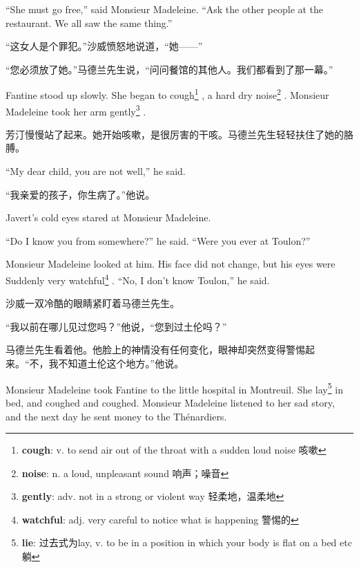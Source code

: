\documentclass[fontset=ubuntu, zihao=5]{ctexart}
\begin{document}
\begin{paracol}{2}
  ``She must go free,'' said Monsieur Madeleine. ``Ask the other people at the restaurant. We all saw the same thing.''


  \switchcolumn

  “这女人是个罪犯。”沙威愤怒地说道，“她——”

  “您必须放了她。”马德兰先生说，“问问餐馆的其他人。我们都看到了那一幕。”

  \switchcolumn*

  Fantine stood up slowly. She began to cough\footnote{\textbf{cough}: v. to
    send air out of the throat with a sudden loud noise 咳嗽} , a hard dry
  noise\footnote{\textbf{noise}: n. a loud, unpleasant sound 响声；噪音}
  . Monsieur Madeleine took her arm gently\footnote{\textbf{gently}: adv. not in a strong or violent way 轻柔地，温柔地}
  .

  \switchcolumn

  芳汀慢慢站了起来。她开始咳嗽，是很厉害的干咳。马德兰先生轻轻扶住了她的胳膊。


  \switchcolumn*

  ``My dear child, you are not well,'' he said.

  \switchcolumn

  “我亲爱的孩子，你生病了。”他说。

  \switchcolumn*

  Javert's cold eyes stared at Monsieur Madeleine.


  ``Do I know you from somewhere?'' he said. ``Were you ever at Toulon?''


  Monsieur Madeleine looked at him. His face did not change, but his eyes were Suddenly very watchful\footnote{\textbf{watchful}: adj. very careful to notice what is happening 警惕的}
  . ``No, I don't know Toulon,'' he said.

  \switchcolumn

  沙威一双冷酷的眼睛紧盯着马德兰先生。


  “我以前在哪儿见过您吗？”他说，“您到过土伦吗？”


  马德兰先生看着他。他脸上的神情没有任何变化，眼神却突然变得警惕起来。“不，我不知道土伦这个地方。”他说。


  \switchcolumn*

  Monsieur Madeleine took Fantine to the little hospital in Montreuil. She
  lay\footnote{\textbf{lie}: 过去式为lay, v. to be in a position in which your body is flat on a bed etc 躺}
  in bed, and coughed and coughed. Monsieur Madeleine listened to her sad story, and the next day he sent money to the Thénardiers.


\end{paracol}
\end{document}
